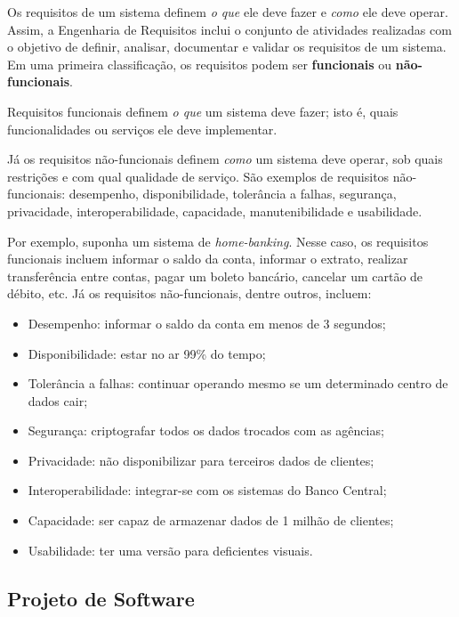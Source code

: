 \documentclass[
  11pt,
  twoside]{book}
\begin{document}
 Os requisitos de um sistema
definem \emph{o que} ele deve fazer e \emph{como} ele deve operar.
Assim, a Engenharia de Requisitos inclui o conjunto de atividades
realizadas com o objetivo de definir, analisar, documentar e validar os
requisitos de um sistema. Em uma primeira classificação, os requisitos
podem ser \textbf{funcionais} ou \textbf{não-funcionais}.

 Requisitos funcionais definem \emph{o que}
um sistema deve fazer; isto é, quais funcionalidades ou serviços ele
deve implementar.

 Já os requisitos não-funcionais
definem \emph{como} um sistema deve operar, sob quais restrições e com
qual qualidade de serviço. São exemplos de requisitos não-funcionais:
desempenho, disponibilidade, tolerância a falhas, segurança,
privacidade, interoperabilidade, capacidade, manutenibilidade e
usabilidade.

Por exemplo, suponha um sistema de \emph{home-banking}. Nesse caso, os
requisitos funcionais incluem informar o saldo da conta, informar o
extrato, realizar transferência entre contas, pagar um boleto bancário,
cancelar um cartão de débito, etc. Já os requisitos não-funcionais,
dentre outros, incluem:

\begin{itemize}
\item
  Desempenho: informar o saldo da conta em menos de 3 segundos;
\item
  Disponibilidade: estar no ar 99\% do tempo;
\item
  Tolerância a falhas: continuar operando mesmo se um determinado centro
  de dados cair;
\item
  Segurança: criptografar todos os dados trocados com as agências;
\item
  Privacidade: não disponibilizar para terceiros dados de clientes;
\item
  Interoperabilidade: integrar-se com os sistemas do Banco Central;
\item
  Capacidade: ser capaz de armazenar dados de 1 milhão de clientes;
\item
  Usabilidade: ter uma versão para deficientes visuais.
\end{itemize}

\hypertarget{projeto-de-software}{%
\subsection{Projeto de Software}\label{projeto-de-software}}
\end{document}
